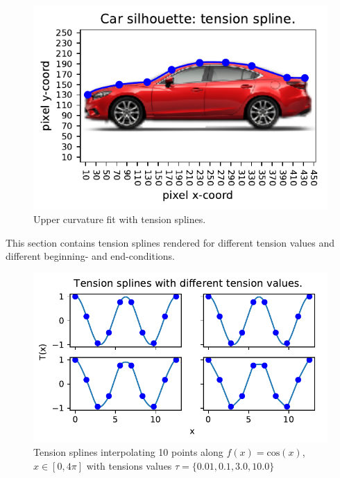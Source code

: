 \documentclass{article}
\begin{document}
  \begin{figure}[!h]
    \center
    \includegraphics{figs/p2-car-tension-splines.pdf}
    \caption{Upper curvature fit with tension splines.}
  \end{figure}

\newpage

  This section contains tension splines rendered for different tension values
  and different beginning- and end-conditions.

  \begin{figure}[!h]
    \center
    \includegraphics{figs/p2-fit-10-points.pdf}
    \caption{Tension splines interpolating 10 points along $f(x) =
    \mathrm{cos}(x)$, $x \in [0,4\pi]$ with tensions values $\tau = \{0.01,
    0.1, 3.0, 10.0\}$}
  \end{figure}
\end{document}
